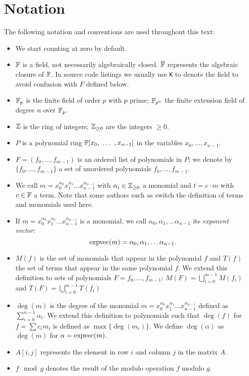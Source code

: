 \section{Notation}
The following notation and conventions are used throughout this text:
\begin{itemize}
\item We start counting at zero by default.
\item $\mathbb{F}$ is a field, not necessarily algebraically closed. $\overline{\mathbb{F}}$ represents the algebraic closure of $\mathbb{F}$. In source code listings we usually use {\tt K} to denote the field to avoid confusion with $F$ defined below.
\item $\mathbb{F}_{p}$ is the finite field of order $p$ with $p$ prime; $\mathbb{F}_{p^n}$ the finite extension field of degree $n$ over $\mathbb{F}_{p}$.
\item $\mathbb{Z}$ is the ring of integers; $\mathbb{Z}_{\geq 0}$ are the integers $\geq 0$.
\item $P$ is a polynomial ring $\F[x_0,\ \dots\ ,x_{n-1}]$ in the variables $x_0,\dots,x_{n-1}$.
\item $F = (f_0, \dots, f_{m-1})$ is an ordered list of polynomials in $P$; we denote by $\{f_0,\dots,f_{m-1}\}$ a set of unordered polynomials $f_0,\dots,f_{m-1}$.
 \item We call $m= x_0^{\alpha_0} x_1^{\alpha_1} \dots x_{n-1}^{\alpha_{n-1}}$ with $\alpha_i \in \mathbb{Z}_{\geq 0}$ a monomial and $t = c \cdot m$ with $c
\in \mathbb{F}$ a term. Note that some authors such as \cite{Becker1991} switch the definition of terms and monomials used here.

\item If $m = x_0^{\alpha_0} x_1^{\alpha_1} \dots x_{n-1}^{\alpha_{n-1}}$ is a monomial, we call $\alpha_0, \alpha_1, \dots \alpha_{n-1}$ its \emph{exponent vector}: $$\textnormal{expvec}(m) = \alpha_0, \alpha_1, \dots \alpha_{n-1}.$$

\item $M(f)$ is the set of monomials that appear in the polynomial $f$ and $T(f)$ the set of terms that appear in the same polynomial $f$. We extend this
definition to sets of polynomials $F = f_0, \dots, f_{m-1}$: $M(F) = \bigcup_{i=0}^{m-1} M(f_i)$ and $T(F) = \bigcup_{i=0}^{m-1} T(f_i)$

\item $\deg(m)$ is the degree of the monomial $m = x_0^{\alpha_0} x_1^{\alpha_1} \dots x_{n-1}^{\alpha_{n-1}}$ defined as $\sum_{i=0}^{n-1} \alpha_i$. We extend this definition to polynomials such that $\deg(f)$ for $f = \sum c_i m_i$ is defined as $\max\{\deg(m_i)\}$. We define $\deg(\alpha)$ as $\deg(m)$ for $\alpha = \textnormal{expvec}(m)$.
\item $A[i,j]$ represents the element in row $i$ and column $j$ in the matrix
$A$.
\item $f \mod g$ denotes the result of the modulo operation $f$ modulo $g$.
\end{itemize}

